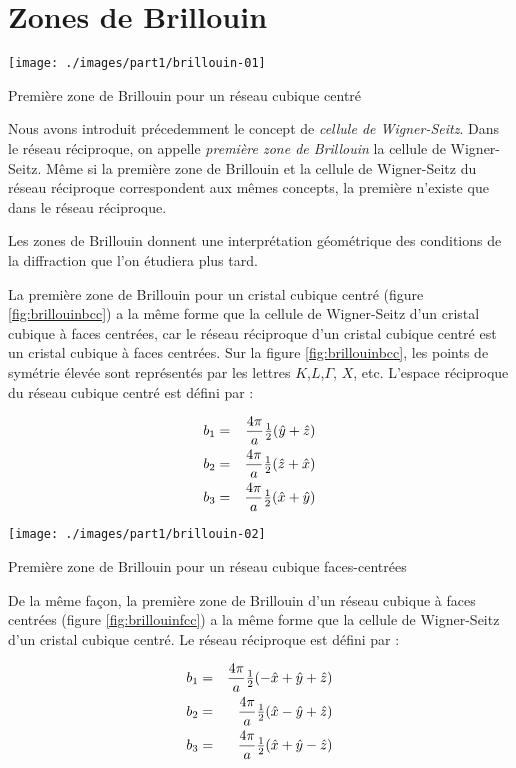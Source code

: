 \section{Zones de Brillouin}

\begin{marginfigure}
\texttt{[image: ./images/part1/brillouin-01]}
\caption{Première zone de Brillouin pour un réseau cubique centré}
\label{fig:brillouinbcc}
\end{marginfigure}

Nous avons introduit précedemment le concept de \emph{cellule de Wigner-Seitz}. Dans le réseau réciproque, on appelle \emph{première zone de Brillouin} la cellule de Wigner-Seitz.
Même si la première zone de Brillouin et la cellule de Wigner-Seitz du réseau réciproque correspondent aux mêmes concepts, la première n'existe que dans le réseau réciproque.

Les zones de Brillouin donnent une interprétation géométrique des conditions de la diffraction que l'on étudiera plus tard.

La première zone de Brillouin pour un cristal cubique centré (figure \ref{fig:brillouinbcc}) a la même forme que la cellule de Wigner-Seitz d'un cristal cubique à faces centrées, car le réseau réciproque d'un cristal cubique centré est un cristal cubique à faces centrées. Sur la figure \ref{fig:brillouinbcc}, les points de symétrie élevée sont représentés par les lettres $K$,$L$,$\Gamma$, $X$, etc. L'espace réciproque du réseau cubique centré est défini par :

\begin{eqnarray}
    b_1 & = & \frac{4\pi}{a} \mbox{$\frac{1}{2}$} (\hat{y} + \hat{z})\\
    b_2 & = & \frac{4\pi}{a} \mbox{$\frac{1}{2}$} (\hat{z} + \hat{x})\\
    b_3 & = & \frac{4\pi}{a} \mbox{$\frac{1}{2}$} (\hat{x} + \hat{y})
\end{eqnarray}
    
\begin{marginfigure}
\texttt{[image: ./images/part1/brillouin-02]}
\caption{Première zone de Brillouin pour un réseau cubique faces-centrées}
\label{fig:brillouinfcc}
\end{marginfigure}

De la même façon, la première zone de Brillouin d'un réseau cubique à faces centrées (figure \ref{fig:brillouinfcc}) a la même forme que la cellule de Wigner-Seitz d'un cristal cubique centré. Le réseau réciproque est défini par :

\begin{eqnarray}
    b_1 & = & \frac{4\pi}{a} \mbox{$\frac{1}{2}$} (-\hat{x} + \hat{y} + \hat{z})\\
    b_2 & = & \frac{4\pi}{a} \mbox{$\frac{1}{2}$} (\hat{x} - \hat{y} + \hat{z})\\
    b_3 & = & \frac{4\pi}{a} \mbox{$\frac{1}{2}$} (\hat{x} + \hat{y} - \hat{z})
\end{eqnarray}

